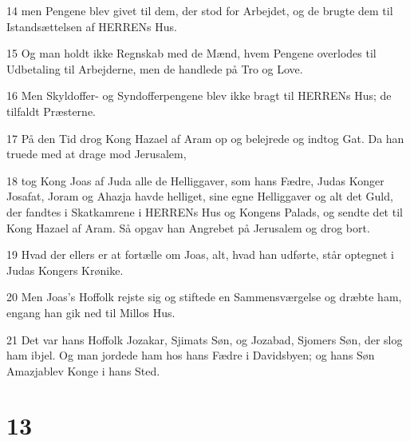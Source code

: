\par 14 men Pengene blev givet til dem, der stod for Arbejdet, og de brugte dem til Istandsættelsen af HERRENs Hus.
\par 15 Og man holdt ikke Regnskab med de Mænd, hvem Pengene overlodes til Udbetaling til Arbejderne, men de handlede på Tro og Love.
\par 16 Men Skyldoffer- og Syndofferpengene blev ikke bragt til HERRENs Hus; de tilfaldt Præsterne.
\par 17 På den Tid drog Kong Hazael af Aram op og belejrede og indtog Gat. Da han truede med at drage mod Jerusalem,
\par 18 tog Kong Joas af Juda alle de Helliggaver, som hans Fædre, Judas Konger Josafat, Joram og Ahazja havde helliget, sine egne Helliggaver og alt det Guld, der fandtes i Skatkamrene i HERRENs Hus og Kongens Palads, og sendte det til Kong Hazael af Aram. Så opgav han Angrebet på Jerusalem og drog bort.
\par 19 Hvad der ellers er at fortælle om Joas, alt, hvad han udførte, står optegnet i Judas Kongers Krønike.
\par 20 Men Joas's Hoffolk rejste sig og stiftede en Sammensværgelse og dræbte ham, engang han gik ned til Millos Hus.
\par 21 Det var hans Hoffolk Jozakar, Sjimats Søn, og Jozabad, Sjomers Søn, der slog ham ibjel. Og man jordede ham hos hans Fædre i Davidsbyen; og hans Søn Amazjablev Konge i hans Sted.

\chapter{13}

